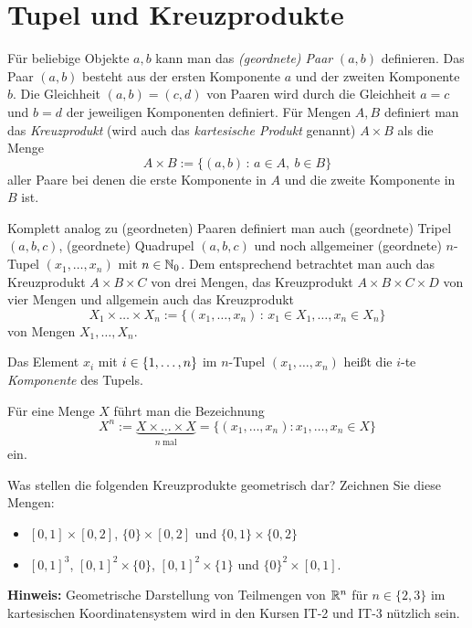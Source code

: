 \section{Tupel und Kreuzprodukte}

\begin{defn} 
Für beliebige Objekte $ a,b $ kann man das \emph{(geordnete) Paar} $ (a,b) $ definieren. Das Paar $(a,b)$ besteht aus der ersten Komponente $a$ und der zweiten Komponente $b$. 
Die Gleichheit $ (a,b) = (c,d) $ von Paaren wird durch die Gleichheit $ a=c $ und $ b=d $ der jeweiligen Komponenten definiert.  Für Mengen $ A,B $ definiert man das \emph{Kreuzprodukt} (wird auch das \emph{kartesische Produkt} genannt) $ A \times B $ als die Menge
\[
A \times B := \{ (a,b) \,:\, a \in A, \ b \in B \}
\]
aller Paare bei denen die erste Komponente in $A$ und die zweite Komponente in $B$ ist. 
\end{defn} 

\begin{defn} 
	Komplett analog zu (geordneten) Paaren definiert man auch (geordnete) Tripel $(a,b,c)$, (geordnete) Quadrupel $(a,b,c)$ und noch allgemeiner (geordnete) $n$-Tupel $(x_1,\ldots,x_n)$ mit $n \in \mathbb{N}_0$. Dem entsprechend betrachtet man auch das Kreuzprodukt $A \times B \times C$ von drei Mengen, das Kreuzprodukt $A \times B \times C \times D$ von vier Mengen und allgemein auch das Kreuzprodukt 
	\[
		X_1 \times \ldots \times X_n := \{ (x_1,\ldots,x_n) \,:\, x_1 \in X_1, \ldots , x_n \in X_n \} 
	\]
	 von Mengen $ X_1,\ldots,X_n $.
	 
	 Das Element $ x_i $ mit $ i \in \{ 1,\ldots,n \} $ im $ n $-Tupel $ (x_1,\ldots,x_n) $ heißt die $ i $-te \emph{Komponente} des Tupels.
	 
Für eine Menge $ X $ führt man die Bezeichnung
\begin{equation*}
	X^n := \underbrace{X \times \ldots \times X}_{n \:\text{mal}} = \{ (x_1,\ldots,x_n) : x_1,\ldots,x_n \in X \}
\end{equation*}
ein. 
\end{defn} 


\begin{aufg} Was stellen die folgenden Kreuzprodukte geometrisch dar? Zeichnen Sie diese Mengen:
	\begin{itemize}
		\item $ [0,1] \times [0,2] $, $ \{ 0 \} \times [0,2] $  und $ \{ 0,1 \} \times \{ 0,2 \} $ 
		\item $ [0,1]^3 $, $ [0,1]^2 \times \{ 0 \} $, $ [0,1]^2 \times \{ 1 \} $  und $ \{ 0 \}^2 \times [0,1] $. 
	\end{itemize}
	\textbf{Hinweis:} Geometrische Darstellung von Teilmengen von $\mathbb{R}^n$ für $n \in \{2,3\}$ im kartesischen Koordinatensystem wird in den Kursen IT-2 und IT-3 nützlich sein. 
\end{aufg}

